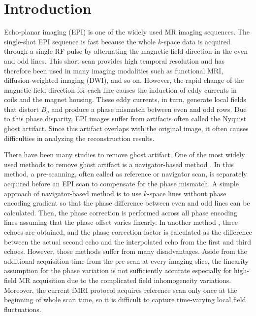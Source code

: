\documentclass[num-refs]{wiley-article}
\newcommand{\0}{{\boldsymbol{0}}}
\newcommand{\1}{\blmath{1}}
\begin{document}
	
	\section{Introduction}
	
	Echo-planar imaging (EPI) is one of the widely used MR imaging sequences. The single-shot EPI sequence is fast because the whole $k$-space data is acquired through a single RF pulse by alternating the magnetic field direction in the even and odd lines. This short scan  provides high temporal resolution and has therefore been used in many imaging modalities such as functional MRI, diffusion-weighted imaging (DWI),  and so on. However, the rapid change of the magnetic field direction for each line causes the induction of eddy currents in coils and the magnet housing. These eddy currents, in turn, generate local fields that distort $B_o$ and produce a phase mismatch between even and odd rows. Due to this phase disparity, EPI images suffer from  artifacts often called the Nyquist ghost artifact. Since this artifact overlaps with the original image, it often causes difficulties in analyzing the reconstruction results.
	
	There have been many studies to remove ghost artifact. One of the most widely used  methods  to remove ghost artifact is a navigator-based method \cite{ahn1987newphase,bruder1992image,hu1996artifact,reeder1999novel,heid2000method}. In this method, a pre-scanning, often called as reference or navigator scan, is separately acquired before an EPI scan to compensate for the phase mismatch. A simple approach of navigator-based method is to use  $k$-space lines without phase encoding gradient so that the phase difference between even and odd lines can be calculated. Then, the phase correction is performed across all phase encoding lines assuming that the phase offset varies linearly. In another method \cite{heid2000method}, three echoes are obtained, and the phase correction factor is calculated as the difference between the actual second echo and the interpolated echo from the first and third echoes.
	However, those methods suffer from many disadvantages. Aside from the additional acquisition time from the pre-scan at every imaging slice, the linearity assumption for the phase variation is not sufficiently accurate especially for high-field MR acquisition due to the complicated field inhomogeneity variations. Moreover, the current fMRI protocol acquires reference scan only once at the beginning of whole scan time, so it is difficult to capture time-varying local field fluctuations.
	
\end{document}
